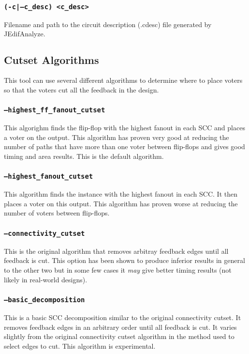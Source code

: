 \subsubsection{\texttt{(-c|--c\_desc) <c\_desc>}}
Filename and path to the circuit description (.cdesc) file generated by
JEdifAnalyze.

\subsection{Cutset Algorithms}
This tool can use several different algorithms to determine where to place
voters so that the voters cut all the feedback in the design. 

\subsubsection{\texttt{--highest\_ff\_fanout\_cutset}}
This algorighm finds the flip-flop with the highest fanout in each SCC and 
places a voter on the output. This algorithm has proven very good at reducing 
the number of paths that have more than one voter between flip-flops and gives
good timing and area results. This is the default algorithm.

\subsubsection{\texttt{--highest\_fanout\_cutset}}
This algorithm finds the instance with the highest fanout in each SCC.
It then places a voter on this output. This algorithm has proven worse 
at reducing the number of voters between flip-flops.

\subsubsection{\texttt{--connectivity\_cutset}}
This is the original algorithm that removes arbitray feedback edges until all
feedback is cut. This option has been shown to produce inferior results in
general to the other two but in some few cases it \emph{may} give better timing
results (not likely in real-world designs).

\subsubsection{\texttt{--basic\_decomposition}}
This is a basic SCC decomposition similar to the original connectivity cutset.
It removes feedback edges in an arbitrary order until all feedback is cut. It
varies slightly from the original connectivity cutset algorithm in the method
used to select edges to cut. This algorithm is experimental.

